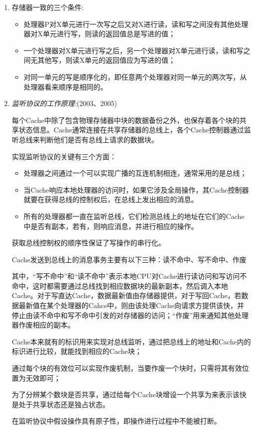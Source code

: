 \documentclass[a4paper]{ctexart}
\begin{document}
\begin{enumerate}
  \item 存储器一致的三个条件:
  \begin{itemize}
    \item 处理器P对X单元进行一次写之后又对X进行读，读和写之间没有其他处理器对X单元进行写，则读的返回值总是写进的值；
    \item 一个处理器对X单元进行写之后，另一个处理器对X单元进行读，读和写之间无其他写，则读X单元的返回值应为写进的值；
    \item 对同一单元的写是顺序化的，即任意两个处理器对同一单元的两次写，从处理器看来顺序是相同的。
  \end{itemize}
  \item \emph{监听协议的工作原理:}(2003、2005)
  
  每个Cache中除了包含物理存储器中块的数据备份之外，也保存着各个块的共享状态信息。Cache通常连接在共享存储器的总线上，各个Cache控制器通过监听总线来判断他们是否有总线上请求的数据块。
  
  实现监听协议的关键有三个方面：
  \begin{itemize}
    \item 处理器之间通过一个可以实现广播的互连机制相连，通常采用的是总线；
    \item 当Cache响应本地处理器的访问时，如果它涉及全局操作，其Cache控制器就要在获得总线的控制权后，在总线上发出相应的消息。
    \item 所有的处理器都一直在监听总线，它们检测总线上的地址在它们的Cache中是否有副本，若有，则响应消息，并进行相应的操作。
  \end{itemize}
  获取总线控制权的顺序性保证了写操作的串行化。
  
  Cache发送到总线上的消息事务主要有以下三种：读不命中、写不命中、作废

  其中，“写不命中”和“读不命中”表示本地CPU对Cache进行读访问和写访问不命中，这时都需要通过总线找到相应数据块的最新副本，然后调入本地Cache。对于写直达Cache，数据最新值由存储器提供，对于写回Cache，若数据最新值在某个处理器的Cahce中，则由该处理Cache向请求方提供该快，并停止由读不命中和写不命中引发的对存储器的访问；“作废”用来通知其他处理器作废相应的副本。
  
  Cache本来就有的标识用来实现对总线监听，通过把总线上的地址和Cache内的标识进行比较，就能找到相应的Cache块；
  
  通过每个块的有效位可以实现作废机制，当要作废一个块时，只需将其有效位置为无效即可；
  
  为了分辨某个数块是否共享，通过给每个Cache块增设一个共享为来表示该快是处于共享状态还是独占状态。
  
  在监听协议中假设操作具有原子性，即操作进行过程中不能被打断。
  

\end{enumerate}
\end{document}
